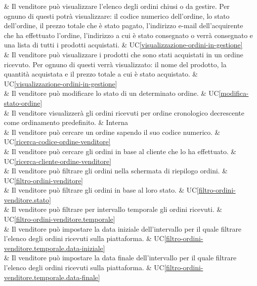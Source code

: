  & Il venditore può visualizzare l'elenco degli ordini chiusi o da gestire. Per ognuno di questi potrà visualizzare: il codice numerico dell'ordine, lo stato dell'ordine, il prezzo totale che è stato pagato, l'indirizzo e-mail dell'acquirente che ha effettuato l'ordine, l'indirizzo a cui è stato consegnato o verrà consegnato e una lista di tutti i prodotti acquistati. & UC\ref{visualizzazione-ordini-in-gestione} \\

 & Il venditore può visualizzare i prodotti che sono stati acquistati in un ordine ricevuto. Per ognuno di questi verrà visualizzato: il nome del prodotto, la quantità acquistata e il prezzo totale a cui è stato acquistato. & UC\ref{visualizzazione-ordini-in-gestione} \\

 & Il venditore può modificare lo stato di un determinato ordine. & UC\ref{modifica-stato-ordine} \\

 & Il venditore visualizzerà gli ordini ricevuti per ordine cronologico decrescente come ordinamento predefinito. & Interna \\

 & Il venditore può cercare un ordine sapendo il suo codice numerico. & UC\ref{ricerca-codice-ordine-venditore} \\
     
 & Il venditore può cercare gli ordini in base al cliente che lo ha effettuato. & UC\ref{ricerca-cliente-ordine-venditore} \\
    
 & Il venditore può filtrare gli ordini nella schermata di riepilogo ordini. & UC\ref{filtro-ordini-venditore} \\
    
 & Il venditore può filtrare gli ordini in base al loro stato. & UC\ref{filtro-ordini-venditore.stato} \\
    
 & Il venditore può filtrare per intervallo temporale gli ordini ricevuti. & UC\ref{filtro-ordini-venditore.temporale} \\
    
 & Il venditore può impostare la data iniziale dell'intervallo per il quale filtrare l'elenco degli ordini ricevuti sulla piattaforma. & UC\ref{filtro-ordini-venditore.temporale.data-iniziale} \\
    
 & Il venditore può impostare la data finale dell'intervallo per il quale filtrare l'elenco degli ordini ricevuti sulla piattaforma. & UC\ref{filtro-ordini-venditore.temporale.data-finale} \\
